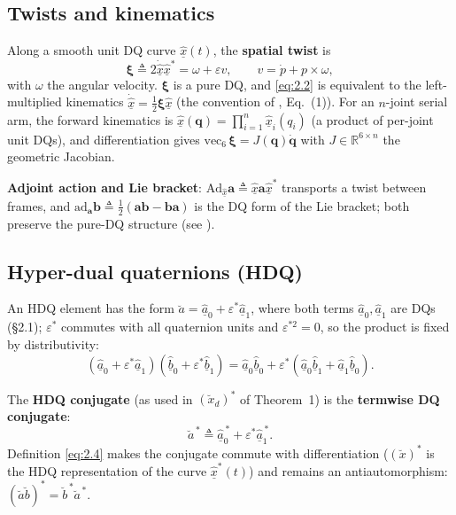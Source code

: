 \subsection{Twists and kinematics}

Along a smooth unit DQ curve $\hat{\underline x}(t)$, the \textbf{spatial twist} is
\begin{equation}
\boldsymbol\xi\triangleq 2\dot{\hat{\underline x}}\hat{\underline x}^{*}=\omega+\varepsilon v,\qquad v=\dot p+p\times\omega,
\tag{2.2}\label{eq:2.2}
\end{equation}
with $\omega$ the angular velocity. $\boldsymbol\xi$ is a pure DQ, and \eqref{eq:2.2} is equivalent to the left-multiplied kinematics $\dot{\hat{\underline x}}=\tfrac12\boldsymbol\xi\hat{\underline x}$ (the convention of \cite{P2}, Eq.~(1)). For an $n$-joint serial arm, the forward kinematics is $\hat{\underline x}(\boldsymbol q)=\prod_{i=1}^n\hat{\underline x}_i(q_i)$ (a product of per-joint unit DQs), and differentiation gives $\mathrm{vec}_6\,\boldsymbol\xi=J(\boldsymbol q)\dot{\boldsymbol q}$ with $J\in\mathbb R^{6\times n}$ the geometric Jacobian.

\textbf{Adjoint action and Lie bracket}: $\mathrm{Ad}_{\hat{\underline x}}\boldsymbol a\triangleq\hat{\underline x}\boldsymbol a\hat{\underline x}^*$ transports a twist between frames, and $\mathrm{ad}_{\boldsymbol a}\boldsymbol b\triangleq\tfrac12(\boldsymbol{ab}-\boldsymbol{ba})$ is the DQ form of the Lie bracket; both preserve the pure-DQ structure (see \cite{Lynch17}).

\subsection{Hyper-dual quaternions (HDQ)}

An HDQ element has the form $\breve a=\hat{\underline a}_0+\varepsilon^*\hat{\underline a}_1$, where both terms $\hat{\underline a}_0,\hat{\underline a}_1$ are DQs (\S2.1); $\varepsilon^{*}$ commutes with all quaternion units and $\varepsilon^{*2}=0$, so the product is fixed by distributivity:
\begin{equation}
(\hat{\underline a}_0+\varepsilon^*\hat{\underline a}_1)(\hat{\underline b}_0+\varepsilon^*\hat{\underline b}_1)=\hat{\underline a}_0\hat{\underline b}_0+\varepsilon^*(\hat{\underline a}_0\hat{\underline b}_1+\hat{\underline a}_1\hat{\underline b}_0).
\tag{2.3}\label{eq:2.3}
\end{equation}

The \textbf{HDQ conjugate} (as used in $(\breve x_d)^*$ of Theorem~1) is the \textbf{termwise DQ conjugate}:
\begin{equation}
\breve a^{\,*}\triangleq\hat{\underline a}_0^{\,*}+\varepsilon^*\hat{\underline a}_1^{\,*}.
\tag{2.4}\label{eq:2.4}
\end{equation}
Definition \eqref{eq:2.4} makes the conjugate commute with differentiation ($(\breve x)^*$ is the HDQ representation of the curve $\hat{\underline x}^*(t)$) and remains an antiautomorphism: $(\breve a\breve b)^*=\breve b^{\,*}\breve a^{\,*}$.

